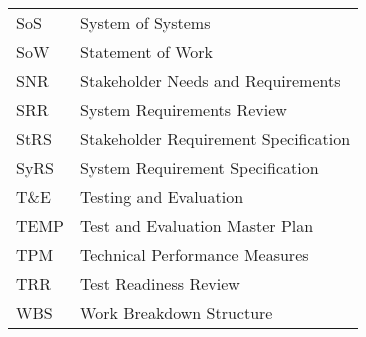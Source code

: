 \documentclass[journal]{IEEEtran}
\begin{document}
\begin{tabular}{ l l }
SoS & System of Systems \\
SoW & Statement of Work \\
SNR & Stakeholder Needs and Requirements \\
SRR & System Requirements Review \\
StRS & Stakeholder Requirement Specification \\
SyRS & System Requirement Specification \\
T\&E & Testing and Evaluation \\
TEMP & Test and Evaluation Master Plan \\
TPM & Technical Performance Measures \\
TRR & Test Readiness Review \\
WBS & Work Breakdown Structure \\
\end{tabular}
\end{document}
